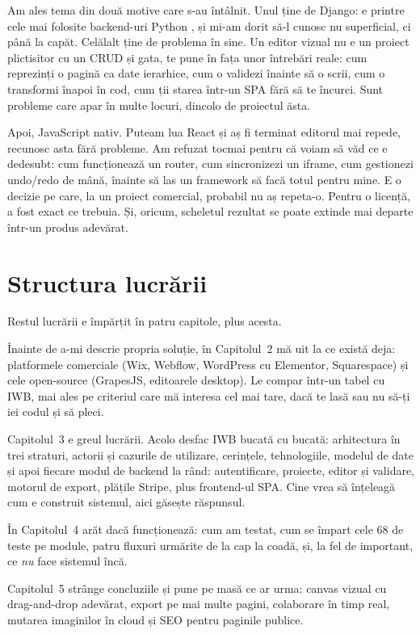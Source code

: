 \documentclass[12pt,a4paper]{report}
\begin{document}
Am ales tema din două motive care s-au întâlnit. Unul ține de Django: e printre cele
mai folosite backend-uri Python \cite{djangodocs}, și mi-am dorit să-l cunosc nu
superficial, ci până la capăt. Celălalt ține de problema în sine. Un editor vizual nu
e un proiect plictisitor cu un CRUD și gata, te pune în fața unor întrebări reale:
cum reprezinți o pagină ca date ierarhice, cum o validezi înainte să o scrii, cum o
transformi înapoi în cod, cum ții starea într-un SPA fără să te încurci. Sunt
probleme care apar în multe locuri, dincolo de proiectul ăsta.

Apoi, JavaScript nativ. Puteam lua React și aș fi terminat editorul mai repede,
recunosc asta fără probleme. Am refuzat tocmai pentru că voiam să văd ce e dedesubt:
cum funcționează un router, cum sincronizezi un iframe, cum gestionezi undo/redo de
mână, înainte să las un framework să facă totul pentru mine. E o decizie pe care, la
un proiect comercial, probabil nu aș repeta-o. Pentru o licență, a fost exact ce
trebuia. Și, oricum, scheletul rezultat se poate extinde mai departe într-un produs
adevărat.

\section{Structura lucrării}

Restul lucrării e împărțit în patru capitole, plus acesta.

Înainte de a-mi descrie propria soluție, în Capitolul~2 mă uit la ce există
deja: platformele comerciale (Wix, Webflow, WordPress cu Elementor, Squarespace) și
cele open-source (GrapesJS, editoarele desktop). Le compar într-un tabel cu IWB, mai
ales pe criteriul care mă interesa cel mai tare, dacă te lasă sau nu să-ți iei
codul și să pleci.

Capitolul~3 e greul lucrării. Acolo desfac IWB bucată cu bucată: arhitectura
în trei straturi, actorii și cazurile de utilizare, cerințele, tehnologiile, modelul
de date și apoi fiecare modul de backend la rând: autentificare, proiecte, editor
și validare, motorul de export, plățile Stripe, plus frontend-ul SPA. Cine vrea să
înțeleagă cum e construit sistemul, aici găsește răspunsul.

În Capitolul~4 arăt dacă funcționează: cum am testat, cum se împart cele 68
de teste pe module, patru fluxuri urmărite de la cap la coadă, și, la fel de
important, ce \emph{nu} face sistemul încă.

Capitolul~5 strânge concluziile și pune pe masă ce ar urma: canvas vizual cu
drag-and-drop adevărat, export pe mai multe pagini, colaborare în timp real, mutarea
imaginilor în cloud și SEO pentru paginile publice.
\end{document}
